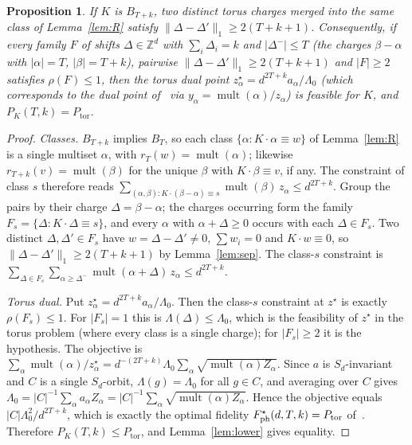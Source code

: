 \documentclass[11pt]{article}
\newcommand{\Z}{\mathbb{Z}}
\newcommand{\mult}{\operatorname{mult}}
\newcommand{\Ptor}{P_{\mathrm{tor}}}
\newtheorem{proposition}[theorem]{Proposition}
\theoremstyle{definition}
\theoremstyle{remark}
\begin{document}
\begin{proposition}\label{prop:reduction}
If $K$ is $B_{T+k}$, two distinct torus charges merged into the same class of Lemma~\ref{lem:R} satisfy
$\lVert\Delta-\Delta'\rVert_1\ge2(T+k+1)$. Consequently, if every family $F$ of shifts $\Delta\in\Z^d$ with $\sum_i\Delta_i=k$ and $|\Delta^-|\le T$ (the charges $\beta-\alpha$ with
$|\alpha|=T$, $|\beta|=T+k$), pairwise $\lVert\Delta-\Delta'\rVert_1\ge 2(T+k+1)$ and $|F|\ge2$ satisfies $\rho(F)\le1$, then the torus dual point
$z^\star_\alpha=d^{2T+k}a_\alpha/\Lambda_0$ (which corresponds to the dual point of~\cite[Eq.~(147)]{Herasymenko2026} via $y_\alpha=\mult(\alpha)/z_\alpha$) is feasible for $K$, and $P_K(T,k)=\Ptor$.
\end{proposition}
\begin{proof}
\emph{Classes.} $B_{T+k}$ implies $B_T$, so each class $\{\alpha:K\cdot\alpha\equiv w\}$ of Lemma~\ref{lem:R} is a single multiset
$\alpha$, with $r_T(w)=\mult(\alpha)$; likewise $r_{T+k}(v)=\mult(\beta)$ for the unique $\beta$ with $K\cdot\beta\equiv v$, if any. The
constraint of class $s$ therefore reads $\sum_{(\alpha,\beta):K\cdot(\beta-\alpha)\equiv s}\mult(\beta)\,z_\alpha\le d^{2T+k}$. Group the
pairs by their charge $\Delta=\beta-\alpha$; the charges occurring form the family $F_s=\{\Delta:K\cdot\Delta\equiv s\}$, and every $\alpha$
with $\alpha+\Delta\ge0$ occurs with each $\Delta\in F_s$. Two distinct $\Delta,\Delta'\in F_s$ have $w=\Delta-\Delta'\ne0$, $\sum w_i=0$ and
$K\cdot w\equiv0$, so $\lVert\Delta-\Delta'\rVert_1\ge2(T+k+1)$ by Lemma~\ref{lem:sep}. The class-$s$ constraint is
$\sum_{\Delta\in F_s}\sum_{\alpha\ge\Delta^-}\mult(\alpha+\Delta)\,z_\alpha\le d^{2T+k}$.

\emph{Torus dual.} Put $z^\star_\alpha=d^{2T+k}a_\alpha/\Lambda_0$. Then the class-$s$ constraint at $z^\star$ is exactly $\rho(F_s)\le1$. For
$|F_s|=1$ this is $\Lambda(\Delta)\le\Lambda_0$, which is the feasibility of $z^\star$ in the torus problem (where every class is a single
charge); for $|F_s|\ge2$ it is the hypothesis. The objective is
$\sum_\alpha\mult(\alpha)/z^\star_\alpha=d^{-(2T+k)}\Lambda_0\sum_\alpha\sqrt{\mult(\alpha)Z_\alpha}$. Since $a$ is $S_d$-invariant and $C$ is a single
$S_d$-orbit, $\Lambda(g)=\Lambda_0$ for all $g\in C$, and averaging over $C$ gives $\Lambda_0=|C|^{-1}\sum_\alpha a_\alpha Z_\alpha
=|C|^{-1}\sum_\alpha\sqrt{\mult(\alpha)Z_\alpha}$. Hence the objective equals $|C|\Lambda_0^2/d^{2T+k}$, which is exactly the optimal fidelity
$F^\star_{\rm ph}(d,T,k)=\Ptor$ of~\cite[Eq.~(16)]{Herasymenko2026}. Therefore $P_K(T,k)\le\Ptor$, and Lemma~\ref{lem:lower} gives equality.
\end{proof}
\end{document}
